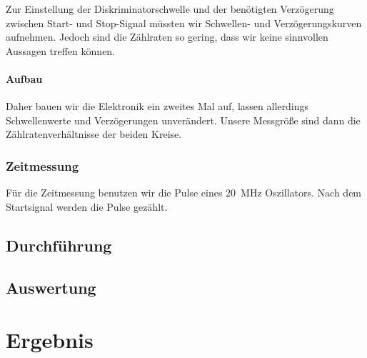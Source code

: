 \documentclass[11pt, ngerman, fleqn, DIV=15, headinclude, BCOR=2cm]{scrreprt}
\begin{document}
Zur Einstellung der Diskriminatorschwelle und der benötigten Verzögerung
zwischen Start- und Stop-Signal müssten wir Schwellen- und Verzögerungskurven
aufnehmen. Jedoch sind die Zählraten so gering, dass wir keine sinnvollen
Aussagen treffen können.

\subsubsection{Aufbau}

Daher bauen wir die Elektronik ein zweites Mal auf,
lassen allerdings Schwellenwerte und Verzögerungen unverändert. Unsere
Messgröße sind dann die Zählratenverhältnisse der beiden Kreise.

\subsection{Zeitmessung}

Für die Zeitmessung benutzen wir die Pulse eines \SI{20}{\mega\hertz}
Oszillators. Nach dem Startsignal werden die Pulse gezählt. 

\section{Durchführung}

\section{Auswertung}

\chapter{Ergebnis}
\end{document}
